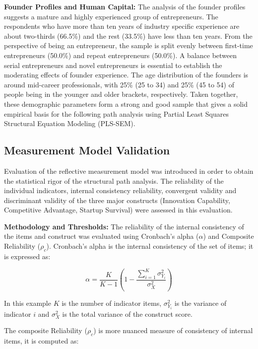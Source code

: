 \documentclass{ieeeaccess}
\begin{document}
\textbf{Founder Profiles and Human Capital:}
The analysis of the founder profiles suggests a mature and highly experienced group of entrepreneurs. The respondents who have more than ten years of industry specific experience are about two-thirds (66.5\%) and the rest (33.5\%) have less than ten years. From the perspective of being an entrepreneur, the sample is split evenly between first-time entrepreneurs (50.0\%) and repeat entrepreneurs (50.0\%). A balance between serial entrepreneurs and novel entrepreneurs is essential to establish the moderating effects of founder experience. The age distribution of the founders is around mid-career professionals, with 25\% (25 to 34) and 25\% (45 to 54) of people being in the younger and older brackets, respectively. Taken together, these demographic parameters form a strong and good sample that gives a solid empirical basis for the following path analysis using Partial Least Squares Structural Equation Modeling (PLS-SEM).


\subsection{Measurement Model Validation}

Evaluation of the reflective measurement model was introduced in order to obtain the statistical rigor of the structural path analysis. The reliability of the individual indicators, internal consistency reliability, convergent validity and discriminant validity of the three major constructs (Innovation Capability, Competitive Advantage, Startup Survival) were assessed in this evaluation.

\textbf{Methodology and Thresholds:}
The reliability of the internal consistency of the items and construct was evaluated using Cronbach's alpha ($\alpha$) and Composite Reliability ($\rho_c$). Cronbach's alpha is the internal consistency of the set of items; it is expressed as:

\begin{equation}
\alpha =
\frac{K}{K - 1}
\left(
1 -
\frac{\sum_{i=1}^{K}\sigma_{Y_i}^{2}}
{\sigma_{X}^{2}}
\right)
\end{equation}

In this example $K$ is the number of indicator items, $\sigma_{Y_i}^{2}$ is the variance of indicator $i$ and $\sigma_{X}^{2}$ is the total variance of the construct score.

The composite Reliability ($\rho_c$) is more nuanced measure of consistency of internal items, it is computed as:
\end{document}
